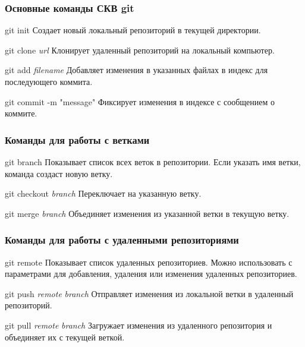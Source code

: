 \documentclass[aspectratio=169]{beamer}
\begin{document}
\begin{frame}
\frametitle{Основные команды СКВ \textbf{git}}
\begin{alertblock}{git init}
Создает новый локальный репозиторий в текущей директории.
\end{alertblock}
\begin{alertblock}{git clone \textit{url}}
Клонирует удаленный репозиторий на локальный компьютер.
\end{alertblock}
\begin{alertblock}{git add \textit{filename}}
Добавляет изменения в указанных файлах в индекс для последующего коммита.
\end{alertblock}
\begin{alertblock}{git commit -m "message"}
Фиксирует изменения в индексе с сообщением о коммите.
\end{alertblock}
\end{frame}

\begin{frame}
\frametitle{Команды для работы с ветками}
\begin{alertblock}{git branch}
Показывает список всех веток в репозитории. Если указать имя ветки, команда создаст новую ветку.
\end{alertblock}
\begin{alertblock}{git checkout \textit{branch}}
Переключает на указанную ветку.
\end{alertblock}
\begin{alertblock}{git merge \textit{branch}}
Объединяет изменения из указанной ветки в текущую ветку.
\end{alertblock}
\end{frame}

\begin{frame}
\frametitle{Команды для работы с удаленными репозиториями}
\begin{alertblock}{git remote}
Показывает список удаленных репозиториев. Можно использовать с параметрами для добавления, удаления или изменения удаленных репозиториев.
\end{alertblock}
\begin{alertblock}{git push \textit{remote} \textit{branch}}
Отправляет изменения из локальной ветки в удаленный репозиторий.
\end{alertblock}
\begin{alertblock}{git pull \textit{remote} \textit{branch}}
Загружает изменения из удаленного репозитория и объединяет их с текущей веткой.
\end{alertblock}
\end{frame}
\end{document}
